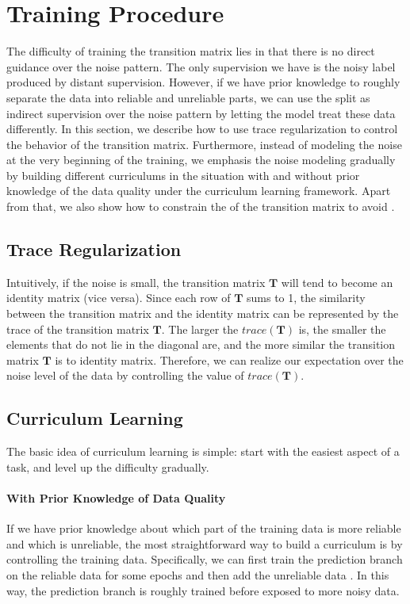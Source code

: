 \section{Training Procedure}
The difficulty of training the transition matrix lies in that there is no direct guidance over the noise pattern. The only supervision we have is the noisy label produced by distant supervision. However, if we have prior knowledge to roughly separate the data into reliable and unreliable parts, we can use the split as indirect supervision over the noise pattern by letting the model treat these data differently. In this section, we describe how to use trace regularization to control the behavior of the transition matrix. Furthermore, instead of modeling the noise at the very beginning of the training, we emphasis the noise modeling gradually by building different curriculums in the situation with and without prior knowledge of the data quality under the curriculum learning framework. Apart from that, we also show how to constrain the  of the transition matrix to avoid .

\subsection{Trace Regularization}
Intuitively, if the noise is small, the transition matrix $\mathbf{T}$ will tend to become an identity matrix (vice versa).  Since each row of $\mathbf{T}$ sums to 1, the similarity between the transition matrix and the identity matrix can be represented by the trace of the transition matrix $\mathbf{T}$. The larger the $trace(\mathbf{T})$ is, the smaller the elements that do not lie in the diagonal are, and the more similar the transition matrix $\mathbf{T}$ is to identity matrix. Therefore, we can realize our expectation over the noise level of the data by controlling the value of $trace(\mathbf{T})$.

\subsection{Curriculum Learning}
The basic idea of curriculum learning is simple: start with the easiest aspect of a task, and level up the difficulty gradually.

\paragraph{With Prior Knowledge of Data Quality}
If we have prior knowledge about which part of the training data is more reliable and which is unreliable, the most straightforward way to build a curriculum is by controlling  the training data. Specifically, we can first train the prediction branch on the reliable data for some epochs and then add the unreliable data . In this way, the prediction branch is roughly trained before exposed to more noisy data.

